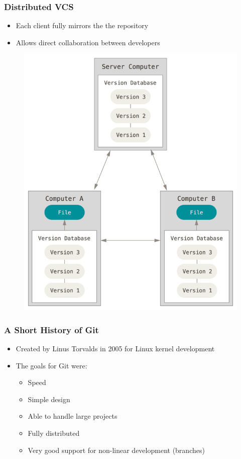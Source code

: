 \documentclass{beamer}
\begin{document}
\begin{frame}
	\frametitle{Distributed VCS}
	\begin{itemize}
		\item{Each client fully mirrors the the repository}
		\item{Allows direct collaboration between developers}
	\end{itemize}
	\begin{figure}
		\includegraphics[scale=0.25]{Distributed_VCS-0.png}
	\end{figure}
\end{frame}


\begin{frame}
	\frametitle{A Short History of Git}
	\begin{itemize}
		\item{Created by Linus Torvalds in 2005 for Linux kernel development}
		\item{The goals for Git were:}
		\begin{itemize}
			\item{Speed}
			\item{Simple design}
			\item{Able to handle large projects}
			\item{Fully distributed}
			\item{Very good support for non-linear development (branches)}
		\end{itemize}
	\end{itemize}
\end{frame}
\end{document}
